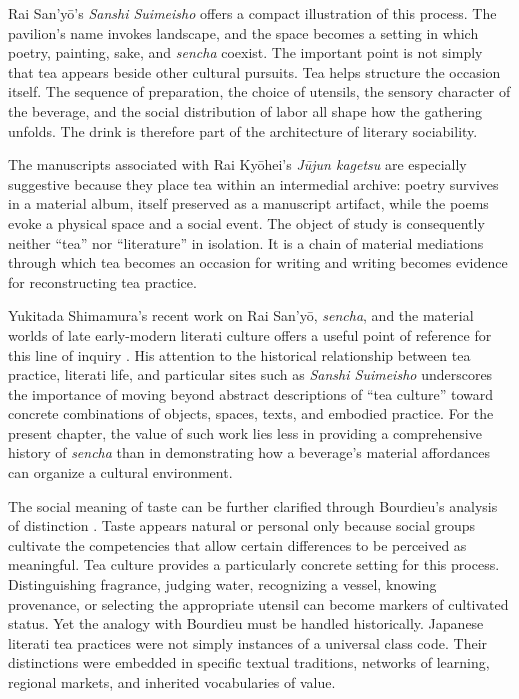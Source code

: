 \documentclass[numbers]{IntechOpen-Book}
\begin{document}
Rai San'yō's \textit{Sanshi Suimeisho} offers a compact illustration of this process. The pavilion's name invokes landscape, and the space becomes a setting in which poetry, painting, sake, and \textit{sencha} coexist. The important point is not simply that tea appears beside other cultural pursuits. Tea helps structure the occasion itself. The sequence of preparation, the choice of utensils, the sensory character of the beverage, and the social distribution of labor all shape how the gathering unfolds. The drink is therefore part of the architecture of literary sociability.

The manuscripts associated with Rai Kyōhei's \textit{Jūjun kagetsu} are especially suggestive because they place tea within an intermedial archive: poetry survives in a material album, itself preserved as a manuscript artifact, while the poems evoke a physical space and a social event. The object of study is consequently neither ``tea'' nor ``literature'' in isolation. It is a chain of material mediations through which tea becomes an occasion for writing and writing becomes evidence for reconstructing tea practice.

Yukitada Shimamura's recent work on Rai San'yō, \textit{sencha}, and the material worlds of late early-modern literati culture offers a useful point of reference for this line of inquiry \cite{shimamaurayale2026}. His attention to the historical relationship between tea practice, literati life, and particular sites such as \textit{Sanshi Suimeisho} underscores the importance of moving beyond abstract descriptions of ``tea culture'' toward concrete combinations of objects, spaces, texts, and embodied practice. For the present chapter, the value of such work lies less in providing a comprehensive history of \textit{sencha} than in demonstrating how a beverage's material affordances can organize a cultural environment.

The social meaning of taste can be further clarified through Bourdieu's analysis of distinction \cite{bourdieu1984}. Taste appears natural or personal only because social groups cultivate the competencies that allow certain differences to be perceived as meaningful. Tea culture provides a particularly concrete setting for this process. Distinguishing fragrance, judging water, recognizing a vessel, knowing provenance, or selecting the appropriate utensil can become markers of cultivated status. Yet the analogy with Bourdieu must be handled historically. Japanese literati tea practices were not simply instances of a universal class code. Their distinctions were embedded in specific textual traditions, networks of learning, regional markets, and inherited vocabularies of value.
\end{document}
